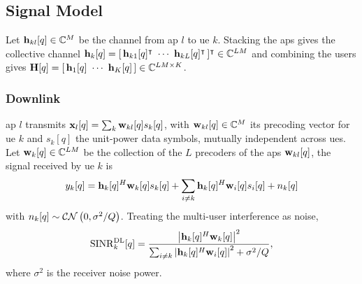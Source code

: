 
\subsection{Signal Model}
\label{ssec:signal}

Let $\boldsymbol{\mathrm{h}}_{kl}[q]\in\mathbb{C}^{M}$ be the channel from \gls{ap} $l$ to \gls{ue} $k$.
Stacking the \glspl{ap} gives the collective channel
$\vect{h}_{k}[q]=[\,\vect{h}_{k1}[q]^{\intercal}\ \cdots\
\vect{h}_{kL}[q]^{\intercal}\,]^{\intercal}\inC{LM}$ and combining the users gives
$\mat{H}[q]=[\,\vect{h}_{1}[q]\ \cdots\ \vect{h}_{K}[q]\,]\inC{LM\times K}$.


\subsubsection{Downlink}
\gls{ap} $l$ transmits $\boldsymbol{\mathrm{x}}_{l}[q]=\sum_{k}\boldsymbol{\mathrm{w}}_{kl}[q]s_{k}[q]$, with
$\boldsymbol{\mathrm{w}}_{kl}[q]\in\mathbb{C}^{M}$ its precoding vector for \gls{ue} $k$ and $s_{k}[q]$
the unit-power data symbols, mutually independent across \glspl{ue}. Let $\boldsymbol{\mathrm{w}}_{k}[q]\in\mathbb{C}^{LM}$ be the collection of the $L$ precoders of the \glspl{ap} $\boldsymbol{\mathrm{w}}_{kl}[q]$, the
signal received by \gls{ue} $k$ is
\begin{align}
y_{k}[q]=\boldsymbol{\mathrm{h}}_{k}[q]^{H}\boldsymbol{\mathrm{w}}_{k}[q]s_{k}[q]
+\sum_{i\neq k}\boldsymbol{\mathrm{h}}_{k}[q]^{H}\boldsymbol{\mathrm{w}}_{i}[q]s_{i}[q]+n_{k}[q]
\end{align} 
with $n_{k}[q]\sim\mathcal{C}\mathcal{N}\left(0,\sigma^{2}/Q\right)$. Treating the multi-user interference as
noise,
\begin{equation}
\label{eq:dl-sinr}
\mathrm{SINR}_{k}^{\mathrm{DL}}[q] =
\frac{\left\lvert\boldsymbol{\mathrm{h}}_{k}[q]^{H}\boldsymbol{\mathrm{w}}_{k}[q]\right\rvert^{2}}
{\sum_{i\neq k}\left\lvert\boldsymbol{\mathrm{h}}_{k}[q]^{H}\boldsymbol{\mathrm{w}}_{i}[q]\right\rvert^{2} + \sigma^{2}/Q} ,
\end{equation}
where $\sigma^{2}$ is the receiver noise power. 
